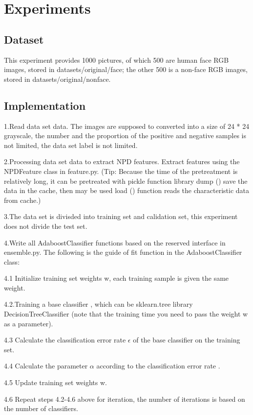 \documentclass[journal, a4paper]{IEEEtran}
\begin{document}
\section{Experiments}
\subsection{Dataset}
This experiment provides 1000 pictures, of which 500 are human face RGB images, stored in datasets/original/face; the other 500 is a non-face RGB images, stored in datasets/original/nonface.
\subsection{Implementation}
1.Read data set data. The images are supposed to converted into a size of 24 * 24 grayscale, the number and the proportion of the positive and negative samples is not limited, the data set label is not limited.
\par 2.Processing data set data to extract NPD features. Extract features using the NPDFeature class in feature.py. (Tip: Because the time of the pretreatment is relatively long, it can be pretreated with pickle function library dump () save the data in the cache, then may be used load () function reads the characteristic data from cache.)
\par 3.The data set is divisded into training set and calidation set, this experiment does not divide the test set.
\par 4.Write all AdaboostClassifier functions based on the reserved interface in ensemble.py. The following is the guide of fit function in the AdaboostClassifier class: 
\par 4.1 Initialize training set weights w, each training sample is given the same weight. 
\par 4.2.Training a base classifier , which can be sklearn.tree library DecisionTreeClassifier (note that the training time you need to pass the weight w as a parameter). 
    \par 4.3 Calculate the classification error rate $\epsilon$ of the base classifier on the training set. 
    \par 4.4 Calculate the parameter $\alpha$ according to the classification error rate . 
    \par 4.5 Update training set weights w. 
    \par 4.6 Repeat steps 4.2-4.6 above for iteration, the number of iterations is based on the number of classifiers.
\end{document}
